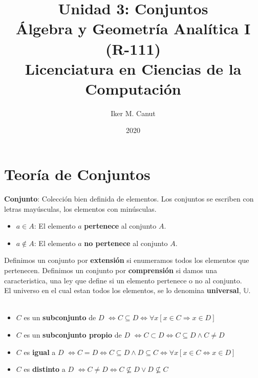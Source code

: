 \documentclass[11pt,a4paper]{article}
\author{Iker M. Canut}
\title{Unidad 3: Conjuntos\\\'Algebra y Geometr\'ia Anal\'itica I (R-111)\\Licenciatura en Ciencias de la Computaci\'on}
\date{2020}
\begin{document}
\maketitle
\newpage
\section{Teor\'ia de Conjuntos}
\textbf{Conjunto}: Colecci\'on bien definida de elementos. Los conjuntos se escriben con letras may\'usculas, los elementos con min\'usculas.
\begin{itemize}
\item $a \in A$: El elemento $a$ \textbf{pertenece} al conjunto $A$.
\item $a \not \in A$: El elemento $a$ \textbf{no pertenece} al conjunto $A$.
\end{itemize}
Definimos un conjunto por \textbf{extensi\'on} si enumeramos todos los elementos que pertenecen. Definimos un conjunto por \textbf{comprensi\'on} si damos una caracteristica, una ley que define si un elemento pertenece o no al conjunto.\\

El universo en el cual estan todos los elementos, se lo denomina \textbf{universal}, $\mathbb{U}$.\\

\noindent \dotfill\\

\begin{itemize}
\item $C$ es un \textbf{subconjunto} de $D$ $\iff C \subseteq D \iff \forall x[x \in C \Rightarrow x \in D]$

\item $C$ es un \textbf{subconjunto propio} de $D$ $\iff C \subset D \iff C \subseteq D \land C \not = D$

\item $C$ es \textbf{igual} a $D$ $\iff C = D \iff C \subseteq D \land D \subseteq C \iff \forall x[x \in C \iff x \in D]$
\item $C$ es \textbf{distinto} a $D$ $\iff C \not = D \iff C \not \subseteq D \lor D \not \subseteq C$
\end{itemize}
\noindent \dotfill\\
\end{document}

